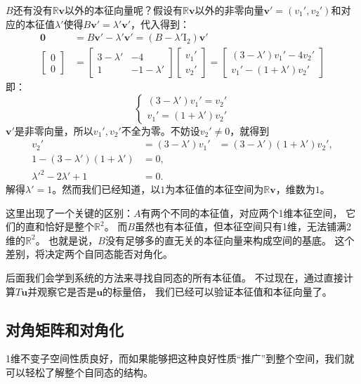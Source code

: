 \documentclass[12pt,UTF8]{ctexbook}
\begin{document}
$B$还有没有$\mathbb{R}\mathbf{v}$以外的本征向量呢？假设有$\mathbb{R}\mathbf{v}$以外的非零向量$\mathbf{v}'=(v_1', v_2')$和对应的本征值$\lambda'$使得$B \mathbf{v}' = \lambda' \mathbf{v}'$，代入得到：
\begin{align*}
    \mathbf{0} &= B\mathbf{v}' - \lambda'\mathbf{v}' = (B - \lambda' \mathrm{I}_2)\mathbf{v}' \\
    \begin{bmatrix} 0 \\ 0 \end{bmatrix} &=  \begin{bmatrix} 3 - \lambda' & -4 \\ 1 & -1 - \lambda' \end{bmatrix} \begin{bmatrix}
       v_1'\\ v_2'
    \end{bmatrix} =  \begin{bmatrix}
       (3 - \lambda')v_1' - 4v_2' \\ v_1' - (1+\lambda')v_2'
    \end{bmatrix}
\end{align*}
即：
$$
\left\{
    \begin{aligned}
        (3 - \lambda')v_1' = v_2' \\
        v_1'= (1+\lambda')v_2' 
    \end{aligned}
\right.
$$
$\mathbf{v}'$是非零向量，所以$v_1', v_2'$不全为零。不妨设$v_2'\neq 0$，就得到
\begin{align*}
    v_2' &= (3 - \lambda')v_1' &= (3 - \lambda')(1+\lambda')v_2', \\
    1 - (3 - \lambda')(1+\lambda') &= 0, \\
    \lambda'^2 - 2\lambda' + 1 &= 0.
\end{align*}
解得$\lambda' = 1$。然而我们已经知道，以$1$为本征值的本征空间为$\mathbb{R}\mathbf{v}$，维数为$1$。

这里出现了一个关键的区别：$A$有两个不同的本征值，对应两个1维本征空间，
它们的直和恰好是整个$\mathbb{R}^2$。
而$B$虽然也有本征值，但本征空间只有1维，无法铺满2维的$\mathbb{R}^2$。
也就是说，$B$没有足够多的直无关的本征向量来构成空间的基底。
这个差别，将决定两个自同态能否对角化。

后面我们会学到系统的方法来寻找自同态的所有本征值。
不过现在，通过直接计算$T\mathbf{u}$并观察它是否是$\mathbf{u}$的标量倍，
我们已经可以验证本征值和本征向量了。

\subsection{对角矩阵和对角化}
1维不变子空间性质良好，而如果能够把这种良好性质“推广”到整个空间，我们就可以轻松了解整个自同态的结构。
\end{document}
